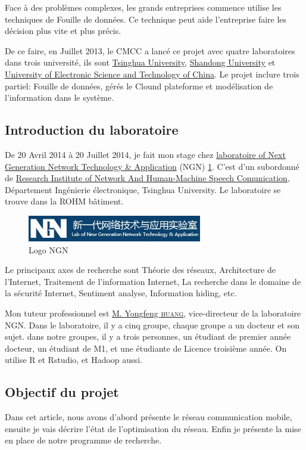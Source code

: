 Face à des problèmes complexes, les grands entreprises commence utilise les techniques de Fouille de données. Ce technique peut aide l'entreprise faire les décision plus vite et plus précis.

De ce faire, en Juillet 2013, le CMCC a lancé ce projet avec quatre laboratoires dans trois université, ils sont
 \href{http://www.tsinghua.edu.cn/publish/newthuen/index.html}{Tsinghua University}, \href{http://en.sdu.edu.cn/}{Shandong University} et \href{http://www.oice.uestc.edu.cn/en/}{University of Electronic Science and Technology of China}. Le projet inclure trois partiel: Fouille de données, gérés le Clound plateforme et modélisation de l'information dans le système.
 

  \subsection{Introduction du laboratoire}
 De 20 Avril 2014 à 20 Juillet 2014, je fait mon stage chez \href{http://203.91.121.76/joomla/}{laboratoire of Next Generation Network Technology \& Application} \textsf{(NGN)} \ref{Logo NGN}. C'est d'un subordonné de \href{http://www.ee.tsinghua.edu.cn/publish/eeen/3776/index.html}{Research Institute of Network And Human-Machine Speech Comunication}, Département Ingénierie électronique, Tsinghua University. Le laboratoire se trouve dans la ROHM bâtiment.
  \begin{figure}[H]
      \centering
      \includegraphics[width=3in]{images/NGN.jpg}
      \caption{Logo NGN}
      \label{Logo NGN}
  \end{figure}
Le principaux axes de recherche sont Théorie des réseaux, Architecture de l'Internet, Traitement de l'information Internet, La recherche dans le domaine de la sécurité Internet, Sentiment analyse, Information hiding, etc.

 Mon tuteur professionnel est \href{http://203.91.121.76/joomla/index.php/staff/teacher/83-huangyongfeng}{M. Yongfeng \textsc{huang}}, vice-directeur de la laboratoire NGN. Dans le laboratoire, il y a cinq groupe, chaque groupe a un docteur et son sujet. dans notre groupes, il y a trois personnes, un étudiant de premier année docteur, un étudiant de M1, et une étudiante de Licence troisième année. On utilise R et Rstudio, et Hadoop aussi.
 
 \subsection{Objectif du projet}
Dans cet article, nous avons d'abord présente le réseau communication mobile, ensuite je vais décrire l'état de l'optimisation du réseau. Enfin je présente la mise en place de notre programme de recherche. 